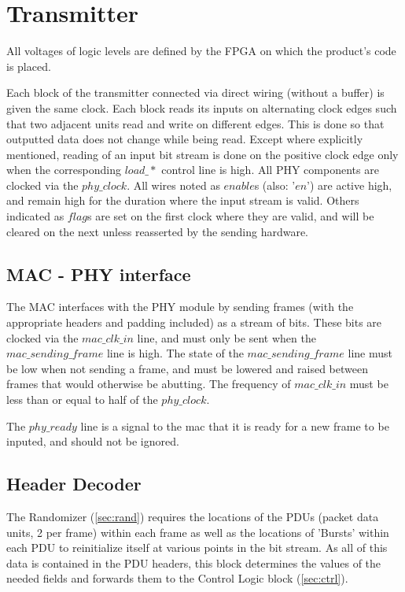 \documentclass[10pt]{article}
\begin{document}
\section{Transmitter}
All voltages of logic levels are defined by the FPGA on which the product's
code is placed.

Each block of the transmitter connected via direct wiring (without a buffer) is
given the same clock. Each block reads its inputs on alternating clock edges
such that two adjacent units read and write on different edges. This is done so
that outputted data does not change while being read. Except where explicitly
mentioned, reading of an input bit stream is done on the positive clock edge
only when the corresponding $load\_*$ control line is high. All PHY components
are clocked via the $phy\_clock$. All wires noted as $enable$s (also: '$en$')
are active high, and remain high for the duration where the input stream is
valid. Others indicated as $flag$s are set on the first clock where they are
valid, and will be cleared on the next unless reasserted by the sending
hardware.

	\subsection{MAC - PHY interface}
	\label{sec:mac_phy}
	The MAC interfaces with the PHY module by sending frames (with the
	appropriate headers and padding included) as a stream of bits. These
	bits are clocked via the $mac\_clk\_in$ line, and must only be sent
	when the $mac\_sending\_frame$ line is high. The state of the
	$mac\_sending\_frame$ line must be low when not sending a frame, and
	must be lowered and raised between frames that would otherwise be
	abutting. The frequency of $mac\_clk\_in$ must be less than or equal
	to half of the $phy\_clock$.

	The $phy\_ready$ line is a signal to the mac that it is ready for a
	new frame to be inputed, and should not be ignored.

	\subsection{Header Decoder}
	\label{sec:header}
	The Randomizer (\autoref{sec:rand}) requires the locations of the
	PDUs (packet data units, 2 per frame) within each frame as well as the
	locations of 'Bursts' within each PDU to reinitialize itself at
	various points in the bit stream. As all of this data is contained in
	the PDU headers, this block determines the values of the needed fields
	and forwards them to the Control Logic block (\autoref{sec:ctrl}). 
\end{document}
